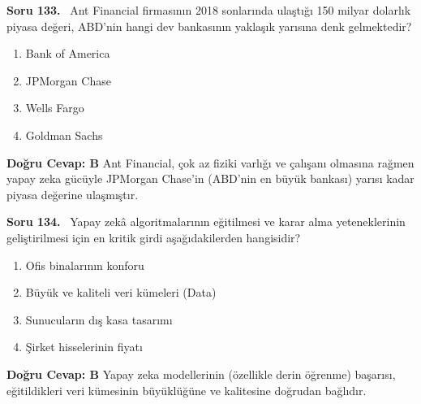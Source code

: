 \documentclass[11pt,a4paper,openany]{book}
\begin{document}
\needspace{5cm}
\vspace{8pt}
\noindent\textbf{\large\sffamily Soru 133.} \ Ant Financial firmasının 2018 sonlarında ulaştığı 150 milyar dolarlık piyasa değeri, ABD'nin hangi dev bankasının yaklaşık yarısına denk gelmektedir?
\begin{enumerate}[label=\Alph*), leftmargin=25pt, topsep=4pt, itemsep=2pt]
    \item Bank of America
    \item JPMorgan Chase
    \item Wells Fargo
    \item Goldman Sachs
\end{enumerate}
\vspace{4pt}
\begin{tcolorbox}[title=Cevap ve Açıklama, colback=gray!3!white, colframe=primarycolor!90!black, arc=2mm, fonttitle=\bfseries\sffamily, top=6pt, bottom=6pt]
    \textbf{Doğru Cevap: B}
    \vspace{2pt}
    Ant Financial, çok az fiziki varlığı ve çalışanı olmasına rağmen yapay zeka gücüyle JPMorgan Chase'in (ABD'nin en büyük bankası) yarısı kadar piyasa değerine ulaşmıştır.
\end{tcolorbox}
\vspace{10pt}

\needspace{5cm}
\vspace{8pt}
\noindent\textbf{\large\sffamily Soru 134.} \ Yapay zekâ algoritmalarının eğitilmesi ve karar alma yeteneklerinin geliştirilmesi için en kritik girdi aşağıdakilerden hangisidir?
\begin{enumerate}[label=\Alph*), leftmargin=25pt, topsep=4pt, itemsep=2pt]
    \item Ofis binalarının konforu
    \item Büyük ve kaliteli veri kümeleri (Data)
    \item Sunucuların dış kasa tasarımı
    \item Şirket hisselerinin fiyatı
\end{enumerate}
\vspace{4pt}
\begin{tcolorbox}[title=Cevap ve Açıklama, colback=gray!3!white, colframe=primarycolor!90!black, arc=2mm, fonttitle=\bfseries\sffamily, top=6pt, bottom=6pt]
    \textbf{Doğru Cevap: B}
    \vspace{2pt}
    Yapay zeka modellerinin (özellikle derin öğrenme) başarısı, eğitildikleri veri kümesinin büyüklüğüne ve kalitesine doğrudan bağlıdır.
\end{tcolorbox}
\vspace{10pt}
\end{document}
